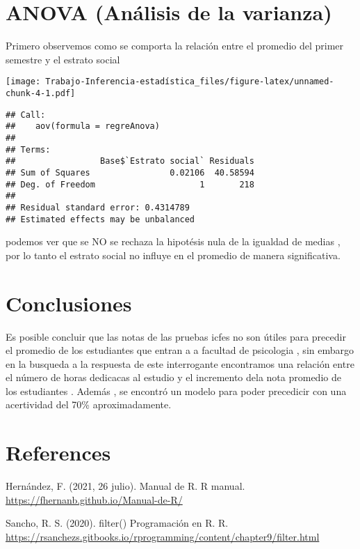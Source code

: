 \documentclass[
  man]{apa6}
\begin{document}
\hypertarget{anova-anuxe1lisis-de-la-varianza}{%
\section{ANOVA (Análisis de la varianza)}\label{anova-anuxe1lisis-de-la-varianza}}

Primero observemos como se comporta la relación entre el promedio del
primer semestre y el estrato social

\texttt{[image: Trabajo-Inferencia-estadística\_files/figure-latex/unnamed-chunk-4-1.pdf]}

\begin{verbatim}
## Call:
##    aov(formula = regreAnova)
## 
## Terms:
##                 Base$`Estrato social` Residuals
## Sum of Squares                0.02106  40.58594
## Deg. of Freedom                     1       218
## 
## Residual standard error: 0.4314789
## Estimated effects may be unbalanced
\end{verbatim}

podemos ver que se NO se rechaza la hipotésis nula de la igualdad de medias , por lo tanto
el estrato social no influye en el promedio de manera significativa.

\hypertarget{conclusiones}{%
\section{Conclusiones}\label{conclusiones}}

Es posible concluir que las notas de las pruebas icfes no son útiles para precedir el promedio de
los estudiantes que entran a a facultad de psicologia , sin embargo en la busqueda a la respuesta de este interrogante encontramos una relación entre el número de horas dedicacas al estudio y el incremento dela nota promedio de los estudiantes . Además , se encontró un modelo para poder precedicir con una acertividad del 70\% aproximadamente.

\hypertarget{references}{%
\section{References}\label{references}}

\begingroup
\setlength{\parindent}{-0.5in}
\setlength{\leftskip}{0.5in}

Hernández, F. (2021, 26 julio). Manual de R. R manual.
\url{https://fhernanb.github.io/Manual-de-R/}

Sancho, R. S. (2020). filter() \textbar{} Programación en R. R.
\url{https://rsanchezs.gitbooks.io/rprogramming/content/chapter9/filter.html}
\end{document}
